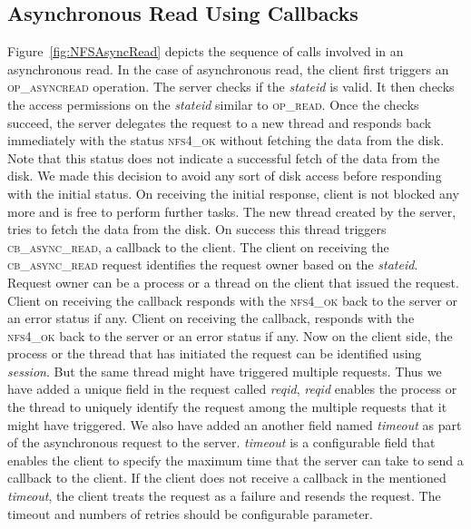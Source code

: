 \subsection{Asynchronous Read Using Callbacks}
Figure~\ref{fig:NFSAsyncRead} depicts the sequence of calls involved in an asynchronous read. In the case of asynchronous read, the client first triggers an \textsc{op\_asyncread} operation. The server checks if the \textit{stateid} is valid. It then checks the access permissions on the \textit{stateid} similar to \textsc{op\_read}. Once the checks succeed, the server delegates the request to a new thread and responds back immediately with the status \textsc{nfs4\_ok} without fetching the data from the disk.  Note that this status does not indicate a successful fetch of the data from the disk. We made this decision to avoid any sort of disk access before responding with the initial status. On receiving the initial response, client is not blocked any more and is free to perform further tasks. The new thread created by the server, tries to fetch the data from the disk. On success this thread triggers  \textsc{cb\_async\_read}, a callback to the client. The client on receiving the \textsc{cb\_async\_read} request identifies the request owner based on the \textit{stateid}. Request owner can  be a process or a thread on the client that issued the request. Client on receiving the callback responds with the \textsc{nfs4\_ok} back to the server or an error status if any.  Client on receiving the callback, responds with the \textsc{nfs4\_ok} back to the server or an error status if any. Now on the client side, the process or the thread that has initiated the request can be identified using \textit{session}. But the same thread might have triggered multiple requests. Thus we have added a unique field in the request called \textit{reqid},  \textit{reqid} enables the process or the thread to uniquely identify the request among the multiple requests that it might have triggered. We also have added an another field named  \textit{timeout} as part of  the asynchronous request to the server. \textit{timeout} is a configurable field that enables the client to specify the maximum time that the server can take to send a callback to the client. If the client does not receive a callback in the mentioned  \textit{timeout}, the client treats the request as a failure and resends the request. The timeout and numbers of retries should be configurable parameter.

